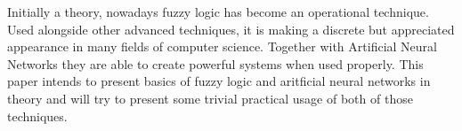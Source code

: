 Initially a theory, nowadays fuzzy logic has become an operational technique.
Used alongside other advanced techniques, it is making a discrete but appreciated appearance in many fields of computer science.
Together with Artificial Neural Networks they are able to create powerful systems when used properly.
This paper intends to present basics of fuzzy logic and aritficial neural networks in theory and will try to present some trivial practical usage of both of those techniques.